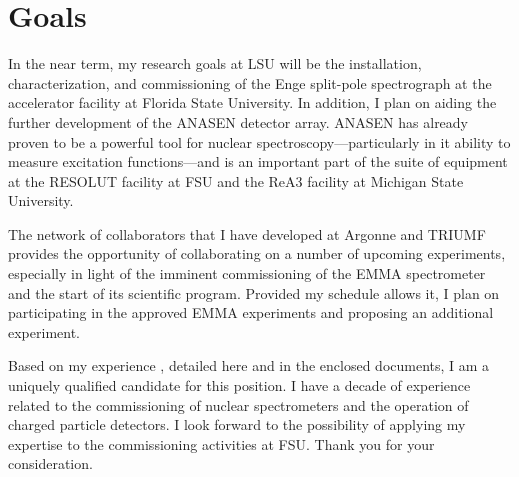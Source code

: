 {%
\section*{Goals}
In the near term, my research goals at LSU will be the installation, characterization, and commissioning of the 
Enge split-pole spectrograph %
at the accelerator facility at Florida State University.
In addition, I plan on aiding the further development of the ANASEN detector array. 
ANASEN has already proven to be a powerful tool for nuclear spectroscopy---particularly in it ability to measure excitation functions---and is an important part of the suite of equipment at the RESOLUT facility at FSU and the ReA3 facility at Michigan State University. 

%


The  network of collaborators that I have developed at Argonne and TRIUMF provides the opportunity of collaborating on a number of upcoming experiments, especially in light of the imminent commissioning of the EMMA spectrometer and the start of its scientific program. Provided my schedule allows it, I plan on participating in the approved EMMA experiments and proposing an additional experiment.

\vspace{1.0\baselineskip}%
Based on my experience%
, detailed here and in the enclosed documents, I am a uniquely qualified candidate for this position.  I have a decade of experience related to the commissioning of nuclear spectrometers and the operation of charged particle detectors. I look forward to the possibility of applying my expertise to the commissioning activities %
at FSU. Thank you for your consideration. 
}

